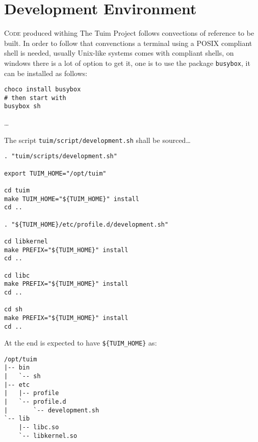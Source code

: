 \section{Development Environment}

\lettrine{C}{ode}
produced withing The Tuim Project follows convections of reference
to be built.
In order to follow that convenctions a terminal using a POSIX compliant
shell is needed, usually Unix-like systems comes with compliant shells,
on windows there is a lot of option to get it,
one is to use the package \texttt{busybox}, it can be installed as follows:

\begin{lstlisting}[style=sh]
choco install busybox
# then start with
busybox sh
\end{lstlisting}

\dots

The script \texttt{tuim/script/development.sh}
shall be sourced\dots

\begin{lstlisting}[style=sh]
. "tuim/scripts/development.sh"

export TUIM_HOME="/opt/tuim"

cd tuim
make TUIM_HOME="${TUIM_HOME}" install
cd ..

. "${TUIM_HOME}/etc/profile.d/development.sh"

cd libkernel
make PREFIX="${TUIM_HOME}" install
cd ..

cd libc
make PREFIX="${TUIM_HOME}" install
cd ..

cd sh
make PREFIX="${TUIM_HOME}" install
cd ..
\end{lstlisting}

At the end is expected to have \texttt{\$\{TUIM\_HOME\}} as:

\begin{lstlisting}
/opt/tuim
|-- bin
|   `-- sh
|-- etc
|   |-- profile
|   `-- profile.d
|       `-- development.sh
`-- lib
    |-- libc.so
    `-- libkernel.so
\end{lstlisting}
